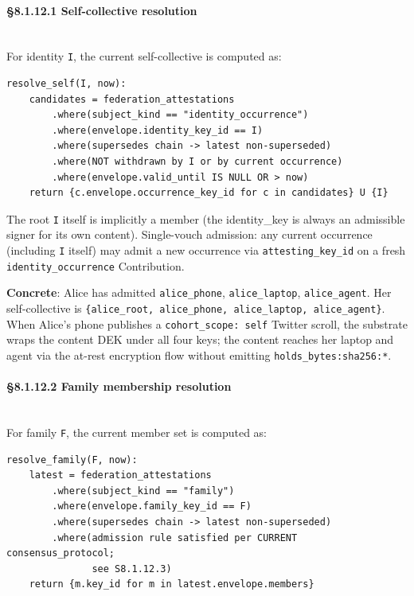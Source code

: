 \documentclass[10pt]{article}
\begin{document}
\paragraph{§8.1.12.1 Self-collective resolution}\mbox{}\\


For identity \texttt{I}, the current self-collective is computed as:


\begin{lstlisting}
resolve_self(I, now):
    candidates = federation_attestations
        .where(subject_kind == "identity_occurrence")
        .where(envelope.identity_key_id == I)
        .where(supersedes chain -> latest non-superseded)
        .where(NOT withdrawn by I or by current occurrence)
        .where(envelope.valid_until IS NULL OR > now)
    return {c.envelope.occurrence_key_id for c in candidates} U {I}
\end{lstlisting}

The root \texttt{I} itself is implicitly a member (the identity\_key is always an admissible signer for its own content). Single-vouch admission: any current occurrence (including \texttt{I} itself) may admit a new occurrence via \texttt{attesting\_key\_id} on a fresh \texttt{identity\_occurrence} Contribution.


\textbf{Concrete}: Alice has admitted \texttt{alice\_phone}, \texttt{alice\_laptop}, \texttt{alice\_agent}. Her self-collective is \texttt{\{alice\_root, alice\_phone, alice\_laptop, alice\_agent\}}. When Alice's phone publishes a \texttt{cohort\_scope: self} Twitter scroll, the substrate wraps the content DEK under all four keys; the content reaches her laptop and agent via the at-rest encryption flow without emitting \texttt{holds\_bytes:sha256:*}.


\paragraph{§8.1.12.2 Family membership resolution}\mbox{}\\


For family \texttt{F}, the current member set is computed as:


\begin{lstlisting}
resolve_family(F, now):
    latest = federation_attestations
        .where(subject_kind == "family")
        .where(envelope.family_key_id == F)
        .where(supersedes chain -> latest non-superseded)
        .where(admission rule satisfied per CURRENT consensus_protocol;
               see S8.1.12.3)
    return {m.key_id for m in latest.envelope.members}
\end{lstlisting}
\end{document}
